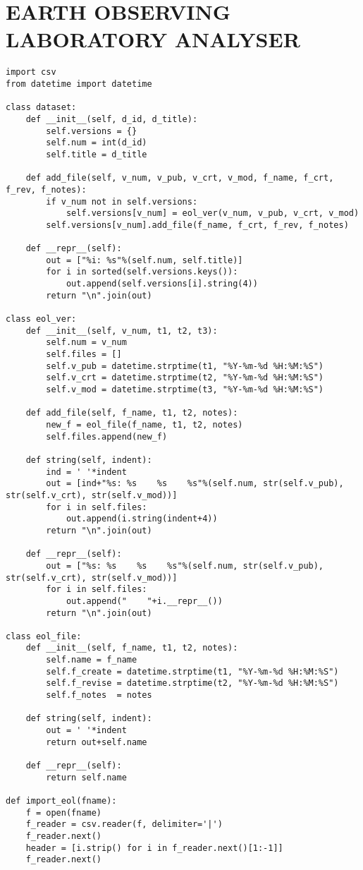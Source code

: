 \chapter{EARTH OBSERVING LABORATORY ANALYSER}
\begin{verbatim}
import csv
from datetime import datetime

class dataset:
	def __init__(self, d_id, d_title):
		self.versions = {}
		self.num = int(d_id)
		self.title = d_title

	def add_file(self, v_num, v_pub, v_crt, v_mod, f_name, f_crt, f_rev, f_notes):
		if v_num not in self.versions:
			self.versions[v_num] = eol_ver(v_num, v_pub, v_crt, v_mod)
		self.versions[v_num].add_file(f_name, f_crt, f_rev, f_notes)

	def __repr__(self):
		out = ["%i: %s"%(self.num, self.title)]
		for i in sorted(self.versions.keys()):
			out.append(self.versions[i].string(4))
		return "\n".join(out)

class eol_ver:
	def __init__(self, v_num, t1, t2, t3):
		self.num = v_num
		self.files = []
		self.v_pub = datetime.strptime(t1, "%Y-%m-%d %H:%M:%S")
		self.v_crt = datetime.strptime(t2, "%Y-%m-%d %H:%M:%S")
		self.v_mod = datetime.strptime(t3, "%Y-%m-%d %H:%M:%S")

	def add_file(self, f_name, t1, t2, notes):
		new_f = eol_file(f_name, t1, t2, notes)
		self.files.append(new_f)

	def string(self, indent):
		ind = ' '*indent
		out = [ind+"%s: %s    %s    %s"%(self.num, str(self.v_pub), str(self.v_crt), str(self.v_mod))]
		for i in self.files:
			out.append(i.string(indent+4))
		return "\n".join(out)

	def __repr__(self):
		out = ["%s: %s    %s    %s"%(self.num, str(self.v_pub), str(self.v_crt), str(self.v_mod))]
		for i in self.files:
			out.append("    "+i.__repr__())
		return "\n".join(out)

class eol_file:
	def __init__(self, f_name, t1, t2, notes):
		self.name = f_name
		self.f_create = datetime.strptime(t1, "%Y-%m-%d %H:%M:%S")
		self.f_revise = datetime.strptime(t2, "%Y-%m-%d %H:%M:%S")
		self.f_notes  = notes

	def string(self, indent):
		out = ' '*indent
		return out+self.name

	def __repr__(self):
		return self.name

def import_eol(fname):
	f = open(fname)
	f_reader = csv.reader(f, delimiter='|')
	f_reader.next()
	header = [i.strip() for i in f_reader.next()[1:-1]]
	f_reader.next()


\end{verbatim}

